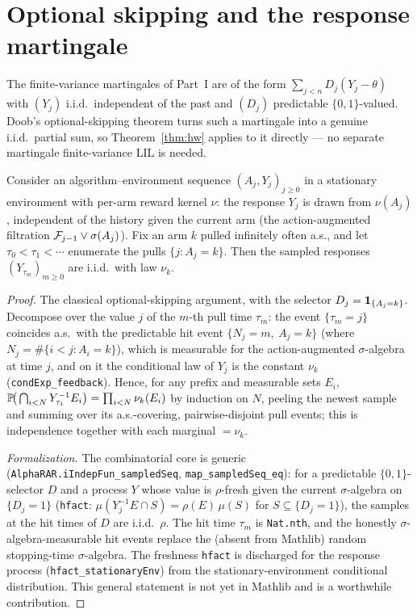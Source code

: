 \section{Optional skipping and the response martingale}
\label{sec:llil_skip}

The finite-variance martingales of Part~I are of the form
$\sum_{j<n}D_j(Y_j-\theta)$ with $(Y_j)$ i.i.d.\ independent of the past and $(D_j)$
predictable $\{0,1\}$-valued. Doob's optional-skipping theorem turns such a martingale
into a genuine i.i.d.\ partial sum, so Theorem~\ref{thm:hw} applies to it directly ---
no separate martingale finite-variance LIL is needed.

\begin{lemma}\label{lem:opt_skip}
\leanok
Consider an algorithm--environment sequence $(A_j,Y_j)_{j\ge0}$ in a stationary environment with
per-arm reward kernel $\nu$: the response $Y_j$ is drawn from $\nu(A_j)$, independent of the history
given the current arm (the action-augmented filtration $\mathcal{F}_{j-1}\vee\sigma(A_j)$). Fix an arm $k$
pulled infinitely often a.s., and let $\tau_0<\tau_1<\cdots$ enumerate the pulls $\{j:A_j=k\}$. Then
the sampled responses $(Y_{\tau_m})_{m\ge0}$ are i.i.d.\ with law $\nu_k$.
\end{lemma}
\begin{proof}\leanok
The classical optional-skipping argument, with the selector $D_j=\mathbf{1}_{\{A_j=k\}}$. Decompose over
the value $j$ of the $m$-th pull time $\tau_m$: the event $\{\tau_m=j\}$ coincides a.s.\ with the
predictable hit event $\{N_j=m,\ A_j=k\}$ (where $N_j=\#\{i<j:A_i=k\}$), which is measurable for the
action-augmented $\sigma$-algebra at time $j$, and on it the conditional law of $Y_j$ is the constant
$\nu_k$ (\texttt{condExp\_feedback}). Hence, for any prefix and measurable sets $E_i$,
$\mathbb{P}\!\big(\bigcap_{i<N}Y_{\tau_i}^{-1}E_i\big)=\prod_{i<N}\nu_k(E_i)$ by induction on $N$, peeling
the newest sample and summing over its a.s.-covering, pairwise-disjoint pull events; this is
independence together with each marginal $=\nu_k$.

\emph{Formalization.} The combinatorial core is generic (\texttt{AlphaRAR.iIndepFun\_sampledSeq},
\texttt{map\_sampledSeq\_eq}): for a predictable $\{0,1\}$-selector $D$ and a process $Y$ whose value
is $\rho$-fresh given the current $\sigma$-algebra on $\{D_j=1\}$
(\texttt{hfact}: $\mu(Y_j^{-1}E\cap S)=\rho(E)\,\mu(S)$ for $S\subseteq\{D_j=1\}$), the samples at the
hit times of $D$ are i.i.d.\ $\rho$. The hit time $\tau_m$ is \texttt{Nat.nth}, and the honestly
$\sigma$-algebra-measurable hit events replace the (absent from Mathlib) random stopping-time
$\sigma$-algebra. The freshness \texttt{hfact} is discharged for the response process
(\texttt{hfact\_stationaryEnv}) from the stationary-environment conditional distribution. This
general statement is not yet in Mathlib and is a worthwhile contribution.
\end{proof}

